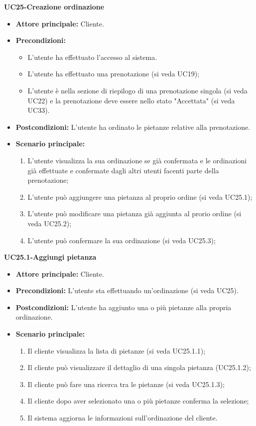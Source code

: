 \textbf{UC25-Creazione ordinazione}
\begin{itemize}
\item \textbf{Attore principale:} Cliente.
\item \textbf{Precondizioni:} 
\begin{itemize}
    \item L'utente ha effettuato l'accesso al sistema.
    \item L'utente ha effettuato una prenotazione (si veda UC19);
    \item L'utente è nella sezione di riepilogo di una prenotazione singola (si veda UC22) e la prenotazione deve essere nello stato "Accettata" (si veda UC33).
\end{itemize}
\item \textbf{Postcondizioni:} L'utente ha ordinato le pietanze relative alla prenotazione.
\item \textbf{Scenario principale:}
\begin{enumerate}
    \item L'utente visualizza la sua ordinazione se già confermata e le ordinazioni già effettuate e confermate dagli altri utenti facenti parte della prenotazione;
    \item L'utente può aggiungere una pietanza al proprio ordine (si veda UC25.1);
    \item L'utente può modificare una pietanza già aggiunta al prorio ordine (si veda UC25.2);
    \item L'utente può confermare la sua ordinazione (si veda UC25.3);
\end{enumerate}
\end{itemize}

\textbf{UC25.1-Aggiungi pietanza}
\begin{itemize}
\item \textbf{Attore principale:} Cliente.
\item \textbf{Precondizioni:} L'utente sta effettuando un'ordinazione (si veda UC25).
\item \textbf{Postcondizioni:} L'utente ha aggiunto una o più pietanze alla propria ordinazione.
\item \textbf{Scenario principale:}
\begin{enumerate}
    \item Il cliente visualizza la lista di pietanze (si veda UC25.1.1);
    \item Il cliente può visualizzare il dettaglio di una singola pietanza (UC25.1.2);
    \item Il cliente può fare una ricerca tra le pietanze (si veda UC25.1.3);
    \item Il cliente dopo aver selezionato una o più pietanze conferma la selezione;
    \item Il sistema aggiorna le informazioni sull'ordinazione del cliente.
\end{enumerate}
\end{itemize}

